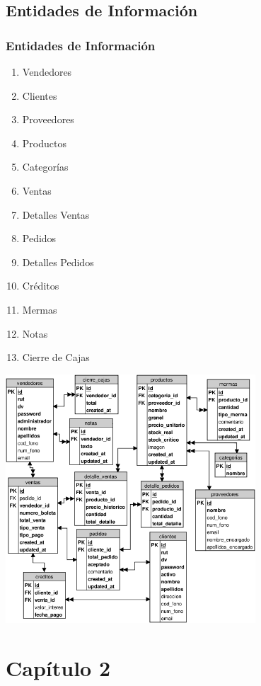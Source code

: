 \documentclass{beamer}
\begin{document}
\subsection{Entidades de Información}

\begin{frame}
\frametitle{Entidades de Información}
\begin{enumerate}
\item Vendedores
\item Clientes
\item Proveedores
\item Productos
\item Categorías
\item Ventas
\item Detalles Ventas
\item Pedidos
\item Detalles Pedidos
\item Créditos
\item Mermas
\item Notas
\item Cierre de Cajas
\end{enumerate}
\end{frame}

\begin{frame}
\begin{center}
\includegraphics[width=0.7\textwidth]{images/modelo_relacional.png}
\end{center}
\end{frame}

\section{Capítulo 2}
\end{document}

